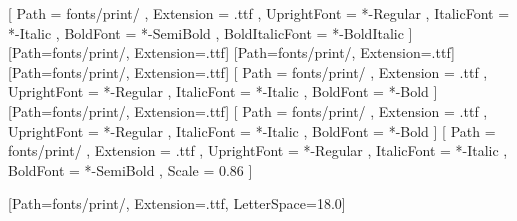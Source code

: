 

\pagecolor{paper}
\AtBeginDocument{\color{ink}}

\usepackage{fontspec}
\setmainfont{Newsreader}[
  Path = fonts/print/ , Extension = .ttf ,
  UprightFont = *-Regular , ItalicFont = *-Italic ,
  BoldFont = *-SemiBold , BoldItalicFont = *-BoldItalic ]
\newfontface{}[Path=fonts/print/, Extension=.ttf]
\newfontface{}[Path=fonts/print/, Extension=.ttf]
\newfontface{}[Path=fonts/print/, Extension=.ttf]
\newfontfamily{}[
  Path = fonts/print/ , Extension = .ttf ,
  UprightFont = *-Regular , ItalicFont = *-Italic ,
  BoldFont = *-Bold ]
\newfontface{}[Path=fonts/print/, Extension=.ttf]
\setsansfont{PublicSans}[
  Path = fonts/print/ , Extension = .ttf ,
  UprightFont = *-Regular , ItalicFont = *-Italic , BoldFont = *-Bold ]
\setmonofont{IBMPlexMono}[
  Path = fonts/print/ , Extension = .ttf ,
  UprightFont = *-Regular , ItalicFont = *-Italic , BoldFont = *-SemiBold ,
  Scale = 0.86 ]

\newfontface{}[Path=fonts/print/, Extension=.ttf, LetterSpace=18.0]
\newcommand{\eyebrow}[2][verdigris]{{\sceyebrowface\footnotesize\color{#1}\MakeUppercase{#2}}}

\AtBeginDocument{\hypersetup{
  linkcolor=verdigrisdeep, citecolor=verdigrisdeep,
  urlcolor=verdigrisdeep, filecolor=verdigrisdeep }}


